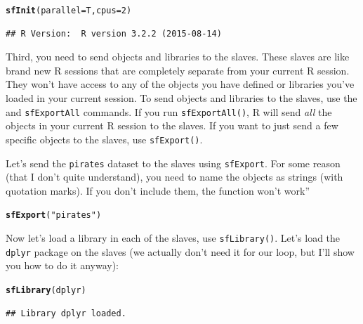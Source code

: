 \documentclass{tufte-book}\usepackage[]{graphicx}\usepackage[]{color}
\makeatletter
\newcommand{\hlnum}[1]{\textcolor[rgb]{0.686,0.059,0.569}{#1}}%
\newcommand{\hlstr}[1]{\textcolor[rgb]{0.192,0.494,0.8}{#1}}%
\newcommand{\hlstd}[1]{\textcolor[rgb]{0.345,0.345,0.345}{#1}}%
\newcommand{\hlkwc}[1]{\textcolor[rgb]{0.333,0.667,0.333}{#1}}%
\newcommand{\hlkwd}[1]{\textcolor[rgb]{0.737,0.353,0.396}{\textbf{#1}}}%
\newenvironment{kframe}{%
 \def\at@end@of@kframe{}%
 \ifinner\ifhmode%
  \def\at@end@of@kframe{\end{minipage}}%
  \begin{minipage}{\columnwidth}%
 \fi\fi%
 \def\FrameCommand##1{\hskip\@totalleftmargin \hskip-\fboxsep
 \colorbox{shadecolor}{##1}\hskip-\fboxsep
     \hskip-\linewidth \hskip-\@totalleftmargin \hskip\columnwidth}%
 \MakeFramed {\advance\hsize-\width
   \@totalleftmargin\z@ \linewidth\hsize
   \@setminipage}}%
 {\par\unskip\endMakeFramed%
 \at@end@of@kframe}
\newenvironment{knitrout}{}{} %
\makeatother
\begin{document}
\begin{knitrout}
\color{fgcolor}\begin{kframe}
\begin{alltt}
\hlkwd{sfInit}\hlstd{(}\hlkwc{parallel} \hlstd{= T,} \hlkwc{cpus} \hlstd{=} \hlnum{2}\hlstd{)}
\end{alltt}
\begin{verbatim}
## R Version:  R version 3.2.2 (2015-08-14)
\end{verbatim}


{\ttfamily\noindent\itshape\color{messagecolor}{\#\# snowfall 1.84-6.1 initialized (using snow 0.4-1): parallel execution on 2 CPUs.}}\end{kframe}
\end{knitrout}

Third, you need to send objects and libraries to the slaves. These slaves are like brand new R sessions that are completely separate from your current R session. They won't have access to any of the objects you have defined or libraries you've loaded in your current session. To send objects and libraries to the slaves, use the  and \texttt{sfExportAll} commands. If you run \texttt{sfExportAll()}, R will send \textit{all} the objects in your current R session to the slaves. If you want to just send a few specific objects to the slaves, use \texttt{sfExport()}.

Let's send the \texttt{pirates} dataset to the slaves using \texttt{sfExport}. For some reason (that I don't quite understand), you need to name the objects as strings (with quotation marks). If you don't include them, the function won't work''

\begin{knitrout}
\color{fgcolor}\begin{kframe}
\begin{alltt}
\hlkwd{sfExport}\hlstd{(}\hlstr{"pirates"}\hlstd{)}
\end{alltt}
\end{kframe}
\end{knitrout}

Now let's load a library in each of the slaves, use \texttt{sfLibrary()}. Let's load the \texttt{dplyr} package on the slaves (we actually don't need it for our loop, but I'll show you how to do it anyway):

\begin{knitrout}
\color{fgcolor}\begin{kframe}
\begin{alltt}
\hlkwd{sfLibrary}\hlstd{(dplyr)}
\end{alltt}
\begin{verbatim}
## Library dplyr loaded.
\end{verbatim}


{\ttfamily\noindent\itshape\color{messagecolor}{\#\# Library dplyr loaded in cluster.}}\end{kframe}
\end{knitrout}
\end{document}
